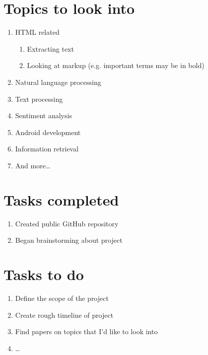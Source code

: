 \documentclass[11pt,a4paper]{article}
\begin{document}
\section{Topics to look into}
\begin{enumerate}
\item HTML related
 \begin{enumerate}
 \item Extracting text
 \item Looking at markup (e.g. important terms may be in bold)
 \end{enumerate}
\item Natural language processing
\item Text processing
\item Sentiment analysis
\item Android development
\item Information retrieval
\item And more\ldots
\end{enumerate}

\section{Tasks completed}
\begin{enumerate}
\item Created public GitHub repository
\item Began brainstorming about project
\end{enumerate}

\section{Tasks to do}
\begin{enumerate}
\item Define the scope of the project
\item Create rough timeline of project
\item Find papers on topics that I'd like to look into
\item \ldots

\end{enumerate}
\end{document}
